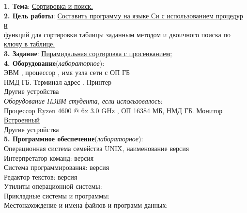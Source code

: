 \documentclass[10pt]{report}
\begin{document}
    \begin{spacing}{1}
        \indent \textbf{1. Тема}: \underline{Сортировка и поиск.}\\  %
        \indent \textbf{2. Цель работы}: \underline{Составить программу на языке Си с использованием процедур и}\\
        \indent \underline{функций для сортировки таблицы заданным методом и двоичного поиска по ключу в таблице.} \\   %
        \indent \textbf{3. Задание}: \underline{Пирамидальная сортировка с просеиванием;}\\   %
        \indent \textbf{4. Оборудование}(\textit{лабораторное}):  \\ 
        \indent ЭВМ \tlinee{0.5in}, процессор \tlinee{0.7in}, имя узла сети \tlinee{0.3in} с ОП \tlinee{0.2in} ГБ\\
        \indent НМД \tlinee{0.5in} ГБ. Терминал \tlinee{0.7in} адрес \tlinee{0.7in}. Принтер \tlinee{0.7in}\\
        \indent Другие устройства \tlinee{2.5in} \\
        \indent \textit{Оборудование ПЭВМ студента, если использовалось}:  \\ 
        \indent Процессор \underline{ Ryzen 4600 @ 6x 3.0 GHz }, ОП \underline{ 16384 } МБ, НМД \tlinee{0.5in}ГБ. Монитор \underline{ Встроенный }\\
        \indent Другие устройства \tlinee{2.5in} \\

        \indent \textbf{5. Программное обеспечение}(\textit{лабораторное}):  \\ 
        \indent Операционная система семейства UNIX, наименование \underline{\hspace{0.5in}} версия \underline{\hspace{0.5in}}\\
        \indent Интерпретатор  команд: \underline{\hspace{2in}} версия \tlinee{0.5in}\\
        \indent Система программирования: \tlinee{2in} версия \tlinee{0.5in}\\
        \indent Редактор текстов: \tlinee{2in} версия \tlinee{0.5in}\\
        \indent Утилиты операционной системы: \tlinee{4in}\\
        \indent Прикладные системы и программы: \tlinee{3.7in}\\
        \indent Местонахождение и имена файлов и программ данных: \tlinee{2.2in}\\


\end{spacing}
\end{document}
